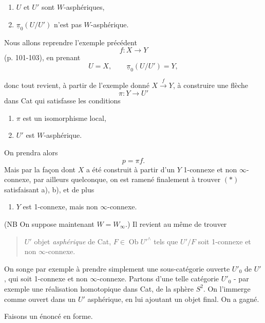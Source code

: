 \documentclass[11pt]{article}
\newcommand{\printedpage}[1]{\marginpar{\footnotesize p.~#1}}
\newcommand{\msp}[1]{\marginpar{\footnotesize [#1]}}
\begin{document}
\begin{enumerate}[label=\alph*)]
\item $U$ et $U'$ sont $W$-asphériques,
\item $\underline{\pi}_0(U/U')$ n'est pas $W$-asphérique.
\end{enumerate}

Nous allons reprendre l'exemple précédent
\[ f:X\longrightarrow Y \]
(p. 101-103), en prenant
\[ U=X,\qquad \underline{\pi}_0(U/U')=Y, \]

\msp{page 106}

donc tout revient, à partir de l'exemple donné $X\xrightarrow{f}Y$, à construire une flèche
\[ \pi:Y\longrightarrow U' \tag*{$(*)$} \]
dans Cat qui satisfasse les conditions

\begin{enumerate}[label=\alph*)]
\item $\pi$ est un isomorphisme local,
\item $U'$ est $W$-asphérique.
\end{enumerate}

On prendra alors
\[ p=\pi f. \]
Mais par la façon dont $X$ a été construit à partir d'un $Y$ 1-connexe et non $\infty$-connexe, par ailleurs quelconque, on est ramené finalement à trouver $(*)$ satisfaisant a), b), et de plus

\begin{enumerate}[label=\alph*), start=3]
\item \printedpage{74}
$Y$ est 1-connexe, mais non $\infty$-connexe.
\end{enumerate}

(NB On suppose maintenant $W=W_\infty$.) Il revient au même de trouver

\begin{quote}
$U'$ objet \textit{asphérique} de Cat, $F\in\operatorname{Ob}U'^\wedge$ tels que $U'/F$ soit 1-connexe et non $\infty$-connexe.
\end{quote}

On songe par exemple à prendre simplement une sous-catégorie ouverte $U'_0$ de $U'$, qui soit 1-connexe et non $\infty$-connexe. Partons d'une telle catégorie $U'_0$ - par exemple une réalisation homotopique dans Cat, de la sphère $S^2$. On l'immerge comme ouvert dans un $U'$ asphérique, en lui ajoutant un objet final. On a gagné.

\msp{page 107}

Faisons un énoncé en forme.
\end{document}
